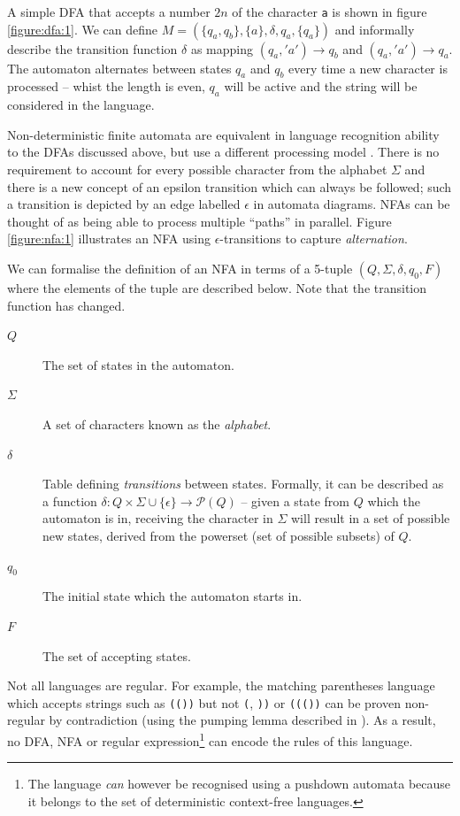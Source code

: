 \documentclass[a4paper,openany,12pt]{book}
\begin{document}
A simple DFA that accepts a number $2n$ of the character \texttt{a} is shown in figure \ref{figure:dfa:1}. We can define $M = (\{q_a,q_b\}, \{a\}, \delta, q_a, \{q_a\})$ and informally describe the transition function $\delta$ as mapping $(q_a, 'a') \rightarrow q_b$ and $(q_a, 'a') \rightarrow q_a$. The automaton alternates between states $q_a$ and $q_b$ every time a new character is processed -- whist the length is even, $q_a$ will be active and the string will be considered in the language.

Non-deterministic finite automata are equivalent in language recognition ability to the DFAs discussed above, but use a different processing model \citep[p.~46]{sipser2012introduction}. There is no requirement to account for every possible character from the alphabet $\Sigma$ and there is a new concept of an epsilon transition which can always be followed; such a transition is depicted by an edge labelled $\epsilon$ in automata diagrams. NFAs can be thought of as being able to process multiple ``paths'' in parallel. Figure \ref{figure:nfa:1} illustrates an NFA using $\epsilon$-transitions to capture \emph{alternation}.

We can formalise the definition of an NFA in terms of a 5-tuple $(Q, \Sigma, \delta, q_0, F)$ where the elements of the tuple are described below. Note that the transition function has changed.

\begin{description}
\item[$Q$] The set of states in the automaton.
\item[$\Sigma$] A set of characters known as the \emph{alphabet}.
\item[$\delta$] Table defining \emph{transitions} between states. Formally, it can be described as a function $\delta : Q \times \Sigma \cup \{\epsilon\} \rightarrow \mathcal{P}(Q)$ -- given a state from $Q$ which the automaton is in, receiving the character in $\Sigma$ will result in a set of possible new states, derived from the powerset (set of possible subsets) of $Q$.
\item[$q_0$] The initial state which the automaton starts in.
\item[$F$] The set of accepting states.
\end{description}

Not all languages are regular. For example, the matching parentheses language which accepts strings such as \texttt{(())} but not \texttt{(}, \texttt{))} or \texttt{((())} can be proven non-regular by contradiction (using the pumping lemma described in \citet{rabin1959finite}). As a result, no DFA, NFA or regular expression\footnote{The language \emph{can} however be recognised using a pushdown automata because it belongs to the set of deterministic context-free languages.} can encode the rules of this language.
\end{document}
